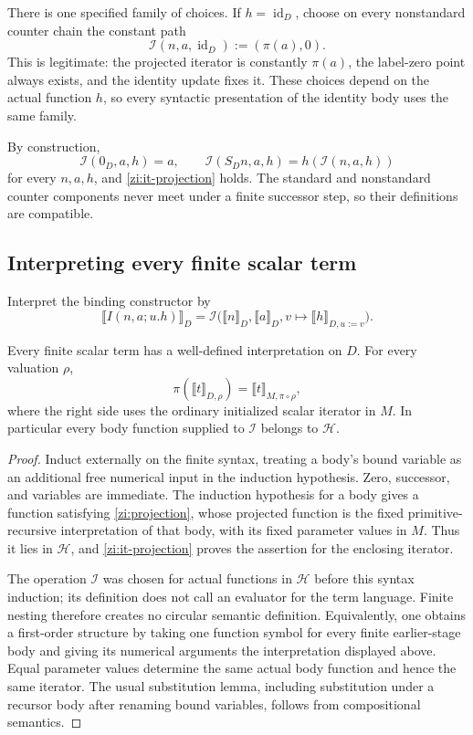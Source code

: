 There is one specified family of choices. If \(h=\operatorname{id}_D\), choose on every nonstandard counter chain the constant path
\[
\mathcal I(n,a,\operatorname{id}_D):=(\pi(a),0).
\tag{Identity choice}\label{zi:identity-choice}
\]
This is legitimate: the projected iterator is constantly \(\pi(a)\), the label-zero point always exists, and the identity update fixes it. These choices depend on the actual function \(h\), so every syntactic presentation of the identity body uses the same family.

By construction,
\[
\mathcal I(0_D,a,h)=a,\qquad
\mathcal I(S_Dn,a,h)=h(\mathcal I(n,a,h))
\]
for every \(n,a,h\), and \eqref{zi:it-projection} holds. The standard and nonstandard counter components never meet under a finite successor step, so their definitions are compatible.

\subsection{Interpreting every finite scalar term}

Interpret the binding constructor by
\[
\llbracket I(n,a;u.h)\rrbracket_D
=
\mathcal I\bigl(\llbracket n\rrbracket_D,
              \llbracket a\rrbracket_D,
              v\mapsto\llbracket h\rrbracket_{D,u:=v}\bigr).
\]

\begin{lemma}
\label{zi:term-projection}
Every finite scalar term has a well-defined interpretation on \(D\). For every valuation \(\rho\),
\[
\pi(\llbracket t\rrbracket_{D,\rho})
=
\llbracket t\rrbracket_{M,\pi\circ\rho},
\]
where the right side uses the ordinary initialized scalar iterator in \(M\). In particular every body function supplied to \(\mathcal I\) belongs to \(\mathscr H\).
\end{lemma}
\begin{proof}
Induct externally on the finite syntax, treating a body's bound variable as an additional free numerical input in the induction hypothesis. Zero, successor, and variables are immediate. The induction hypothesis for a body gives a function satisfying \eqref{zi:projection}, whose projected function is the fixed primitive-recursive interpretation of that body, with its fixed parameter values in \(M\). Thus it lies in \(\mathscr H\), and \eqref{zi:it-projection} proves the assertion for the enclosing iterator.

The operation \(\mathcal I\) was chosen for actual functions in \(\mathscr H\) before this syntax induction; its definition does not call an evaluator for the term language. Finite nesting therefore creates no circular semantic definition. Equivalently, one obtains a first-order structure by taking one function symbol for every finite earlier-stage body and giving its numerical arguments the interpretation displayed above. Equal parameter values determine the same actual body function and hence the same iterator. The usual substitution lemma, including substitution under a recursor body after renaming bound variables, follows from compositional semantics.
\end{proof}

